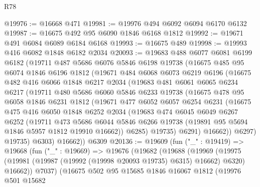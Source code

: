 \begin{lexlean}{R78}
\begin{coremodule}
@19976 := @16668 @471
@19981 := @19976 @494 @6092 @6094 @6170 @6132
@19987 := @16675 @492 @95 @6090 @1846 @6168 @1812
@19992 := @19671 @491 @6084 @6089 @6184 @6168
@19993 := @16675 @489
@19998 := @19993 @416 @6082 @1848 @6182 @2034
@20093 := @19683
    @488
    @6077
    @6081
    @6199
    @6182
    (@19711
      @487
      @5686
      @6076
      @5846
      @6198
      @19738
      (@16675
        @485
        @95
        @6074
        @1846
        @6196
        @1812
        (@19671
          @484
          @6068
          @6073
          @6219
          @6196
          (@16675
            @482
            @416
            @6066
            @1848
            @6217
            @2034
            (@19683
              @481
              @6061
              @6065
              @6234
              @6217
              (@19711
                @480
                @5686
                @6060
                @5846
                @6233
                @19738
                (@16675
                  @478
                  @95
                  @6058
                  @1846
                  @6231
                  @1812
                  (@19671
                    @477
                    @6052
                    @6057
                    @6254
                    @6231
                    (@16675
                      @475
                      @416
                      @6050
                      @1848
                      @6252
                      @2034
                      (@19683
                        @474
                        @6045
                        @6049
                        @6267
                        @6252
                        (@19711
                          @473
                          @5686
                          @6044
                          @5846
                          @6266
                          @19738
                          (@19891 @95 @5694 @1846 @5957 @1812 @19910 @16662))
                        @6285)
                      @19735)
                    @6291)
                  @16662))
              @6297)
            @19735)
          @6303)
        @16662))
    @6309
@20136 := @19609
    (fun ("_" : @19419) =>
    @19668
      (fun ("_" : @19669) =>
      @19676
        (@19682
          (@19688
            (@19969
              (@19975 (@19981 (@19987 (@19992 (@19998 @20093 @19735) @6315) @16662) @6320) @16662))
            @7037)
          (@16675
            @502
            @95
            @15685
            @1846
            @16067
            @1812
            (@19976
              @501
              @15682

\end{coremodule}
\end{lexlean}
